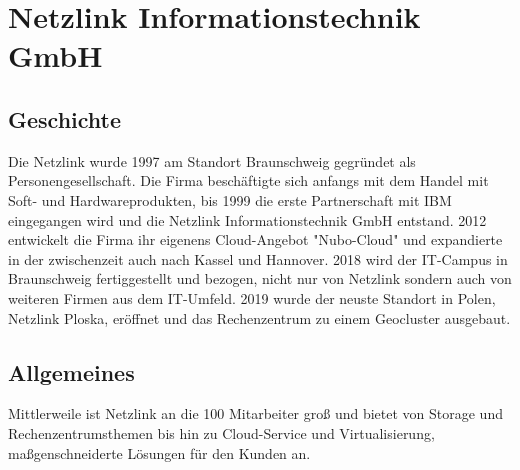 \chapter{Netzlink Informationstechnik GmbH}
\label{app:netzlink}

\section{Geschichte} 
Die Netzlink wurde 1997 am Standort Braunschweig gegründet als Personengesellschaft. 
Die Firma beschäftigte sich anfangs mit dem Handel mit Soft- und Hardwareprodukten, bis 1999 die erste Partnerschaft mit IBM eingegangen wird und die Netzlink Informationstechnik GmbH entstand.
2012 entwickelt die Firma ihr eigenens Cloud-Angebot "Nubo-Cloud" und expandierte in der zwischenzeit auch nach Kassel und Hannover. 
2018 wird der IT-Campus in Braunschweig fertiggestellt und bezogen, nicht nur von Netzlink sondern auch von weiteren Firmen aus dem IT-Umfeld. 
2019 wurde der neuste Standort in Polen, Netzlink Ploska, eröffnet und das Rechenzentrum zu einem Geocluster ausgebaut. 
\cite{Netzlink_history}

\section{Allgemeines}
Mittlerweile ist Netzlink an die 100 Mitarbeiter groß und bietet von Storage und Rechenzentrumsthemen bis hin zu Cloud-Service und Virtualisierung, maßgenschneiderte Lösungen für den Kunden an.
\cite{Netzlink_history}